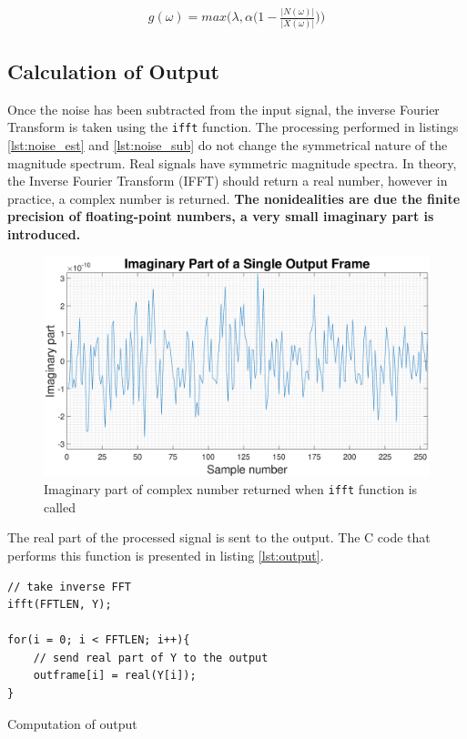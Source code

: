\documentclass[a4paper,pra,twocolumn,10pt,aps,longbibliography,nobalancelastpage]{revtex4-1}
\begin{document}
\begin{align}
    g(\omega) = max\Bigg(\lambda, \alpha\bigg(1 - \frac{|N(\omega)|}{|X(\omega)|}\bigg)\Bigg)\label{eq:g_w_with_alpha}
\end{align}

\subsection{Calculation of Output}
Once the noise has been subtracted from the input signal, the inverse Fourier Transform is taken using the {\tt ifft} function. The processing performed in listings \ref{lst:noise_est} and \ref{lst:noise_sub} do not change the symmetrical nature of the magnitude spectrum. Real signals have symmetric magnitude spectra. In theory, the Inverse Fourier Transform (IFFT) should return a real number, however in practice, a complex number is returned. \textbf{The nonidealities are due the finite precision of floating-point numbers, a very small imaginary part is introduced.}

\begin{figure}[H]
	\centering
	\includegraphics[width=\columnwidth]{y_imaginary}
  	\caption{Imaginary part of complex number returned when {\tt ifft} function is called}
	\label{fig:y_imaginary}
\end{figure}

The real part of the processed signal is sent to the output. The C code that performs this function is presented in listing \ref{lst:output}. 

\begin{listing}
\begin{verbatim}
// take inverse FFT
ifft(FFTLEN, Y);

for(i = 0; i < FFTLEN; i++){
    // send real part of Y to the output
    outframe[i] = real(Y[i]);
}	
\end{verbatim}
\caption{Computation of output} 
\label{lst:output}
\end{listing}
\end{document}
